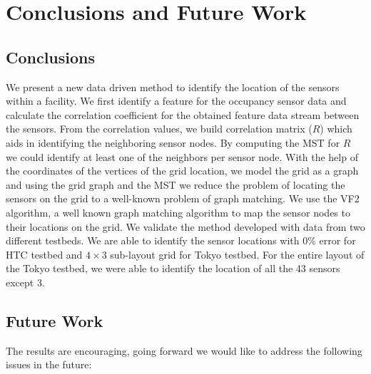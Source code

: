 \chapter{Conclusions and Future Work}
\label{chp:conclusionsandfuturework}

\section{Conclusions}
We present a new data driven method to identify the location of the sensors within a facility. We first identify a feature for the occupancy sensor data and calculate the correlation coefficient for the obtained feature data stream between the sensors. From the correlation values, we build correlation matrix ($R$)  which aids in identifying the neighboring sensor nodes. By computing the MST for $R$ we could identify at least one of the neighbors per sensor node. With the help of the coordinates of the vertices of the grid location, we model the grid as a graph and using the grid graph and the MST we reduce the problem of locating the sensors on the grid to a well-known problem of graph matching. We use the VF2 algorithm, a well known graph matching algorithm to map the sensor nodes to their locations on the grid. We validate the method developed with data from two different testbeds. We are able to identify the sensor locations with 0\% error for HTC testbed and $4\times3$ sub-layout grid for Tokyo testbed. For the entire layout of the Tokyo testbed, we were able to identify the location of all the 43 sensors except 3.  


\section{Future Work}
The results are encouraging, going forward we would like to address the following issues in the future:

